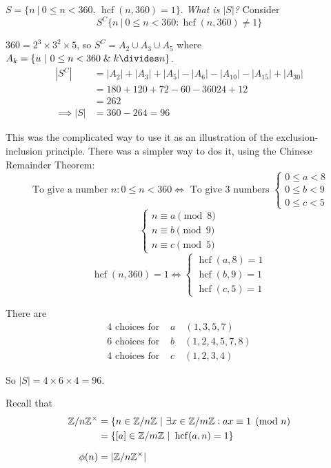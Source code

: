 \documentclass[twoside]{scrartcl}
\DeclareMathOperator{\hcf}{hcf}
\begin{document}
\begin{example}
$S =\{n ~|~ 0 \leq n < 360,\,\hcf(n,360)=1\}$. \emph{What is $|S|$?}
Consider
\[S^C\{n ~|~ 0 \leq n < 360: \hcf(n,360) \neq 1\}\]

$360 = 2^3 \times 3^2 \times 5$, so $S^C = A_2\cup A_3 \cup A_5$ where $A_k = \{u ~|~ 0 \leq n < 360 \;\&\; k \divides n\}$.
\[
\begin{aligned}
  |S^C| &= |A_2| + |A_3| + |A_5| - |A_6| - |A_{10}| - |A_{15}|+ |A_{30}|\\
  &= 180 + 120 + 72 - 60 - 36 0 24 + 12\\
  &= 262\\
  \implies |S| &= 360 - 264 = 96
\end{aligned}
\]

This was the complicated way to use it as an illustration of the exclusion-inclusion principle. There was a simpler way to dos it, using the Chinese Remainder Theorem: 
\[
\text{ To give a number } n:  0 \leq n < 360 
\iff  \text{ To give 3 numbers }
\begin{cases}
 0 \leq a < 8\\
 0 \leq b < 9\\
 0 \leq c < 5  
\end{cases}
\]
\[\begin{cases}
n \equiv a \pmod{8}\\
n \equiv b \pmod{9}\\
n \equiv c \pmod{5}	
\end{cases}
\]
\[\hcf(n,360) = 1 \iff \begin{cases}
 \hcf(a,8) = 1\\
 \hcf(b,9) = 1\\
 \hcf(c,5) = 1	
 \end{cases}
 \]
 
There are
\[
\begin{aligned}
  4 \text{ choices for } &a \quad (1,3,5,7)\\
  6 \text{ choices for } &b \quad (1,2,4,5,7,8)\\
  4 \text{ choices for } &c \quad (1,2,3,4)
\end{aligned}
\]

So $|S| =  4 \times 6 \times 4= 96$. 
\end{example}\vspace*{5pt}


Recall that 
\[
\begin{aligned}
   \Z / n \Z^\times &= \{n \in \Z / n \Z ~|~ \exists x \in \Z / m\Z: ax \equiv 1 \pmod{n}\\
   &= \{[a] \in \Z/m\Z ~|~ \hcf(a,n) = 1\}\\[0.2cm]
   \phi(n) &= |\Z /n \Z^\times|
\end{aligned}
\]
\end{document}

